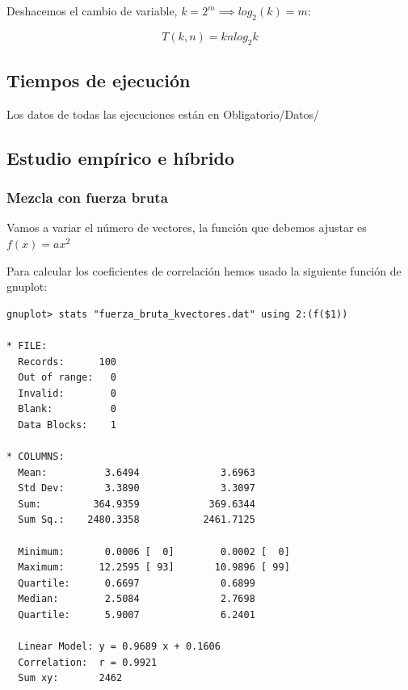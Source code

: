 \begin{center}
	Deshacemos el cambio de variable, $k=2^m \implies log_2(k)=m$:
\end{center}
\[T(k,n) = knlog_2k\]


\subsection{Tiempos de ejecuci\'on}
Los datos de todas las ejecuciones est\'an en Obligatorio/Datos/

\newpage

\subsection{Estudio emp\'irico e h\'ibrido}
\subsubsection{Mezcla con fuerza bruta}
Vamos a variar el n\'umero de vectores, la funci\'on que debemos ajustar es $f(x) = ax^2$

\begin{center}
\end{center}

Para calcular los coeficientes de correlaci\'on hemos usado la siguiente funci\'on de gnuplot:

\begin{lstlisting}[language=gnuplot]
gnuplot> stats "fuerza_bruta_kvectores.dat" using 2:(f($1))

* FILE: 
  Records:      100
  Out of range:   0
  Invalid:        0
  Blank:          0
  Data Blocks:    1

* COLUMNS:
  Mean:          3.6494              3.6963
  Std Dev:       3.3890              3.3097
  Sum:         364.9359            369.6344
  Sum Sq.:    2480.3358           2461.7125

  Minimum:       0.0006 [  0]        0.0002 [  0]
  Maximum:      12.2595 [ 93]       10.9896 [ 99]
  Quartile:      0.6697              0.6899
  Median:        2.5084              2.7698
  Quartile:      5.9007              6.2401

  Linear Model: y = 0.9689 x + 0.1606
  Correlation:  r = 0.9921
  Sum xy:       2462

\end{lstlisting}

